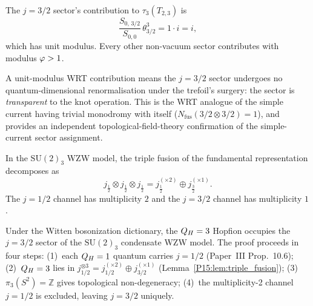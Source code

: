 \begin{proposition}[Pure-phase WRT contribution of $j=3/2$]
\label{P15:prop:wrt_pure}
The $j=3/2$ sector's contribution to $\tau_3(T_{2,3})$ is
\begin{equation}
  \frac{S_{0,\,3/2}}{S_{0,0}}\,\theta_{3/2}^3
  = 1\cdot i = i,
  \label{P15:eq:wrt_pure}
\end{equation}
which has unit modulus. Every other non-vacuum sector contributes
with modulus $\varphi>1$.
\end{proposition}

\begin{remark}
\label{P15:rem:wrt_physical_interp}
A unit-modulus WRT contribution means the $j=3/2$ sector
undergoes no quantum-dimensional renormalisation under the trefoil's
surgery: the sector is \emph{transparent} to the knot operation.
This is the WRT analogue of the simple current having trivial
monodromy with itself ($N_{\mathrm{fus}}(3/2\otimes3/2)=1$),
and provides an independent
topological-field-theory confirmation of the simple-current
sector assignment.
\end{remark}

\begin{lemma}[Triple-fusion decomposition at $k=3$]
\label{P15:lem:triple_fusion}
In the $\mathrm{SU}(2)_3$ WZW model, the triple fusion of the
fundamental representation decomposes as
\begin{equation}
  j_{\frac12}\otimes j_{\frac12}\otimes j_{\frac12}
  = j_{\frac12}^{(\times 2)} \oplus j_{\frac32}^{(\times 1)}.
  \label{P15:eq:triple_fusion}
\end{equation}
The $j=1/2$ channel has multiplicity $2$ and the $j=3/2$ channel
has multiplicity $1$.
\end{lemma}

\begin{theorem}[Sector assignment: $\QH=3\leftrightarrow j=3/2$]
\label{P15:thm:sector_assignment}
Under the Witten bosonization dictionary, the $Q_H=3$ Hopfion occupies
the $j=3/2$ sector of the $\mathrm{SU}(2)_3$ condensate WZW model.
The proof proceeds in four steps: (1)~each $Q_H=1$ quantum carries
$j=1/2$ (Paper~III Prop.~10.6); (2)~$Q_H=3$ lies in
$j_{1/2}^{\otimes3}=j_{1/2}^{(\times2)}\oplus j_{3/2}^{(\times1)}$
(Lemma~\ref{P15:lem:triple_fusion}); (3)~$\pi_3(S^2)=\mathbb{Z}$ gives
topological non-degeneracy; (4)~the multiplicity-2 channel $j=1/2$
is excluded, leaving $j=3/2$ uniquely.
\end{theorem}

